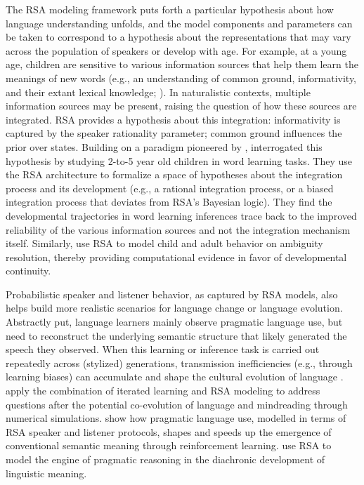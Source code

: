 \documentclass{sp}
\begin{document}
The RSA modeling framework puts forth a particular hypothesis about how language understanding unfolds, and the model components and parameters can be taken to correspond to a hypothesis about the representations that may vary across the population of speakers or develop with age.
For example, at a young age, children are sensitive to various information sources that help them learn the meanings of new words (e.g., an understanding of common ground, informativity, and their extant lexical knowledge; \citealp{markman1988children, schulze2013, akhtar1996role}).
In naturalistic contexts, multiple information sources may be present, raising the question of how these sources are integrated.
RSA provides a hypothesis about this integration: informativity is captured by the speaker rationality parameter; common ground influences the prior over states.
Building on a paradigm pioneered by \cite{frank2014inferring},
\cite{bohn2019integrating, bohn2019predicting} interrogated this hypothesis by studying 2-to-5 year old children in word learning tasks. 
They use the RSA architecture to formalize a space of hypotheses about the integration process and its development (e.g., a rational integration process, or a biased integration process that deviates from RSA's Bayesian logic).
They find the developmental trajectories in word learning inferences trace back to the improved reliability of the various information sources and not the integration mechanism itself.
Similarly, \cite{savinellietal2017,savinellietal2018} use RSA to model child and adult behavior on ambiguity resolution, thereby providing computational evidence in favor of developmental continuity.

Probabilistic speaker and listener behavior, as captured by RSA models, also helps build more realistic scenarios for language change or language evolution.
Abstractly put, language learners mainly observe pragmatic language use, but need to reconstruct the underlying semantic structure that likely generated the speech they observed.
When this learning or inference task is carried out repeatedly across (stylized) generations, transmission inefficiencies (e.g., through learning biases) can accumulate and shape the cultural evolution of language \citep[e.g.][]{BrochhagenFranke2017:Co-evolution-of,CarcassiSchwoustra2019:The-evolution-o,Carcassi2020:The-cultural-ev}.
\citet{WoensdregtCummins2020:A-computational} apply the combination of iterated learning and RSA modeling to address questions after the potential co-evolution of language and mindreading through numerical simulations.
\citet{OhmerKonig2020:Reinforcement-o} show how pragmatic language use, modelled in terms of RSA speaker and listener protocols, shapes and speeds up the emergence of conventional semantic meaning through reinforcement learning.
\cite{lundetal2019} use RSA to model the engine of pragmatic reasoning in the diachronic development of linguistic meaning.
\end{document}
